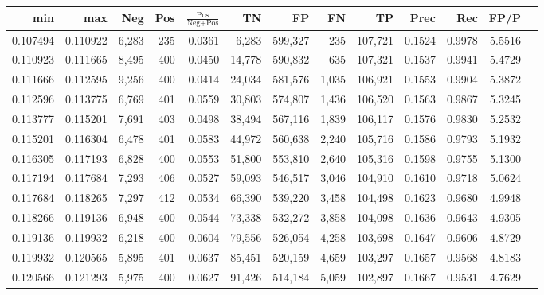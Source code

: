 \begin{tabular}{rrrrrrrrrrrrr}
\toprule
     min &      max &   Neg & Pos & $\frac{\text{Pos}}{\text{Neg}+\text{Pos}}$ &      TN &      FP &      FN &      TP &   Prec &    Rec &   FP/P \\
\midrule
0.107494 & 0.110922 & 6,283 & 235 &                                     0.0361 &   6,283 & 599,327 &     235 & 107,721 & 0.1524 & 0.9978 & 5.5516 \\
0.110923 & 0.111665 & 8,495 & 400 &                                     0.0450 &  14,778 & 590,832 &     635 & 107,321 & 0.1537 & 0.9941 & 5.4729 \\
0.111666 & 0.112595 & 9,256 & 400 &                                     0.0414 &  24,034 & 581,576 &   1,035 & 106,921 & 0.1553 & 0.9904 & 5.3872 \\
0.112596 & 0.113775 & 6,769 & 401 &                                     0.0559 &  30,803 & 574,807 &   1,436 & 106,520 & 0.1563 & 0.9867 & 5.3245 \\
0.113777 & 0.115201 & 7,691 & 403 &                                     0.0498 &  38,494 & 567,116 &   1,839 & 106,117 & 0.1576 & 0.9830 & 5.2532 \\
0.115201 & 0.116304 & 6,478 & 401 &                                     0.0583 &  44,972 & 560,638 &   2,240 & 105,716 & 0.1586 & 0.9793 & 5.1932 \\
0.116305 & 0.117193 & 6,828 & 400 &                                     0.0553 &  51,800 & 553,810 &   2,640 & 105,316 & 0.1598 & 0.9755 & 5.1300 \\
0.117194 & 0.117684 & 7,293 & 406 &                                     0.0527 &  59,093 & 546,517 &   3,046 & 104,910 & 0.1610 & 0.9718 & 5.0624 \\
0.117684 & 0.118265 & 7,297 & 412 &                                     0.0534 &  66,390 & 539,220 &   3,458 & 104,498 & 0.1623 & 0.9680 & 4.9948 \\
0.118266 & 0.119136 & 6,948 & 400 &                                     0.0544 &  73,338 & 532,272 &   3,858 & 104,098 & 0.1636 & 0.9643 & 4.9305 \\
0.119136 & 0.119932 & 6,218 & 400 &                                     0.0604 &  79,556 & 526,054 &   4,258 & 103,698 & 0.1647 & 0.9606 & 4.8729 \\
0.119932 & 0.120565 & 5,895 & 401 &                                     0.0637 &  85,451 & 520,159 &   4,659 & 103,297 & 0.1657 & 0.9568 & 4.8183 \\
0.120566 & 0.121293 & 5,975 & 400 &                                     0.0627 &  91,426 & 514,184 &   5,059 & 102,897 & 0.1667 & 0.9531 & 4.7629 \\

\end{tabular}
